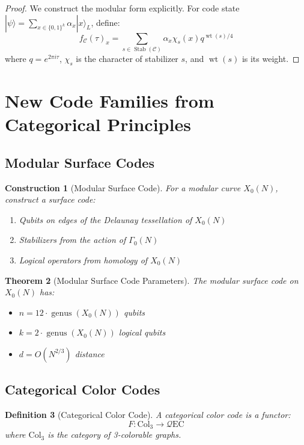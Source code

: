\documentclass[12pt,a4paper]{article}
\newtheorem{theorem}{Theorem}[section]
\newtheorem{definition}[theorem]{Definition}
\newtheorem{construction}[theorem]{Construction}
\DeclareMathOperator{\Stab}{Stab}
\DeclareMathOperator{\wt}{wt}
\DeclareMathOperator{\genus}{genus}
\begin{document}
\begin{proof}
We construct the modular form explicitly. For code state $|\psi\rangle = \sum_{x \in \{0,1\}^k} \alpha_x |x\rangle_L$, define:
\[
f_\mathcal{C}(\tau)_x = \sum_{s \in \Stab(\mathcal{C})} \alpha_x \chi_s(x) q^{\wt(s)/4}
\]
where $q = e^{2\pi i \tau}$, $\chi_s$ is the character of stabilizer $s$, and $\wt(s)$ is its weight.
\end{proof}

\section{New Code Families from Categorical Principles}

\subsection{Modular Surface Codes}

\begin{construction}[Modular Surface Code]
For a modular curve $X_0(N)$, construct a surface code:
\begin{enumerate}
\item Qubits on edges of the Delaunay tessellation of $X_0(N)$
\item Stabilizers from the action of $\Gamma_0(N)$
\item Logical operators from homology of $X_0(N)$
\end{enumerate}
\end{construction}

\begin{theorem}[Modular Surface Code Parameters]
The modular surface code on $X_0(N)$ has:
\begin{itemize}
\item $n = 12 \cdot \genus(X_0(N))$ qubits
\item $k = 2 \cdot \genus(X_0(N))$ logical qubits
\item $d = O(N^{2/3})$ distance
\end{itemize}
\end{theorem}

\subsection{Categorical Color Codes}

\begin{definition}[Categorical Color Code]
A categorical color code is a functor:
\[
F: \text{Col}_3 \to \mathcal{Q}\text{EC}
\]
where $\text{Col}_3$ is the category of 3-colorable graphs.
\end{definition}
\end{document}
